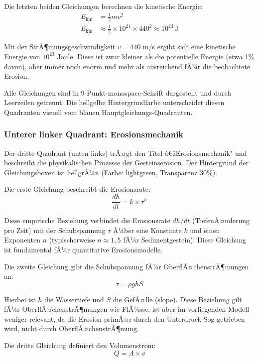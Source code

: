 Die letzten beiden Gleichungen berechnen die kinetische Energie:
\begin{align*}
E_{\mathrm{kin}} &= \frac{1}{2} m v^2 \\
E_{\mathrm{kin}} &\approx \frac{1}{2} \times 10^{21} \times 440^2 \approx 10^{23} \, \mathrm{J}
\end{align*}

Mit der StrÃ¶mungsgeschwindigkeit $v = 440$ m/s ergibt sich eine kinetische Energie von $10^{23}$ Joule. Diese ist zwar kleiner als die potentielle Energie (etwa 1\% davon), aber immer noch enorm und mehr als ausreichend fÃ¼r die beobachtete Erosion.

Alle Gleichungen sind in 9-Punkt-monospace-Schrift dargestellt und durch Leerzeilen getrennt. Die hellgelbe Hintergrundfarbe unterscheidet diesen Quadranten visuell vom blauen Hauptgleichungs-Quadranten.

\subsubsection*{Unterer linker Quadrant: Erosionsmechanik}

Der dritte Quadrant (unten links) trÃ¤gt den Titel â€žErosionsmechanik" und beschreibt die physikalischen Prozesse der Gesteinserosion. Der Hintergrund der Gleichungsboxen ist hellgrÃ¼n (Farbe: lightgreen, Transparenz 30\%).

Die erste Gleichung beschreibt die Erosionsrate:
\begin{equation*}
\frac{dh}{dt} = k \times \tau^n
\end{equation*}

Diese empirische Beziehung verbindet die Erosionsrate $dh/dt$ (TiefenÃ¤nderung pro Zeit) mit der Schubspannung $\tau$ Ã¼ber eine Konstante $k$ und einen Exponenten $n$ (typischerweise $n \approx 1{,}5$ fÃ¼r Sedimentgestein). Diese Gleichung ist fundamental fÃ¼r quantitative Erosionsmodelle.

Die zweite Gleichung gibt die Schubspannung fÃ¼r OberflÃ¤chenstrÃ¶mungen an:
\begin{equation*}
\tau = \rho g h S
\end{equation*}

Hierbei ist $h$ die Wassertiefe und $S$ die GefÃ¤lle (slope). Diese Beziehung gilt fÃ¼r OberflÃ¤chenstrÃ¶mungen wie FlÃ¼sse, ist aber im vorliegenden Modell weniger relevant, da die Erosion primÃ¤r durch den Unterdruck-Sog getrieben wird, nicht durch OberflÃ¤chenstrÃ¶mung.

Die dritte Gleichung definiert den Volumenstrom:
\begin{equation*}
Q = A \times v
\end{equation*}

